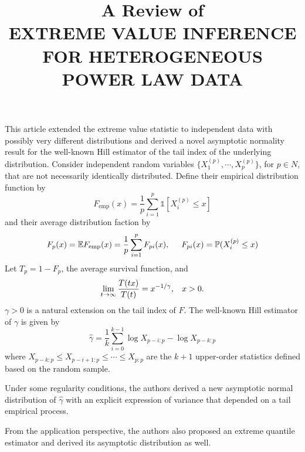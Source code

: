 \documentclass[11pt]{article}
\title{A Review of \\ EXTREME VALUE INFERENCE FOR HETEROGENEOUS POWER LAW DATA}
\begin{document}
	\maketitle	


This article extended the extreme value statistic to independent data with possibly very different distributions and derived a novel asymptotic normality result for the well-known Hill estimator of the tail index of the underlying distribution. Consider independent random variables $\{ X^{(p)}_1, \cdots, X^{(p)}_p \}$, for $p \in N$, that are not necessarily identically distributed. Define their empirical distribution function by
$$
F_{\text{emp}}(x) = \frac{1}{p}\sum_{i=1}^p \mathbb{1}[X_i^{(p)} \le x]
$$
and their average distribution faction by
$$
F_p(x) = \mathbb{E} F_{\text{emp}}(x) = \frac{1}{p}\sum_{i=1}^p F_{pi}(x), \hspace{5mm} F_{pi}(x) = \mathbb{P}(X_i^{(p)} \le x)
$$
Let $T_p = 1 - F_p$, the average survival function, and 
$$
\lim_{t \to \infty}\frac{T(tx)}{T(t)} = x^{-1/\gamma}, \hspace{3mm} x > 0.
$$
$\gamma > 0$ is a natural extension on the tail index of $F$. The well-known Hill estimator of $\gamma$ is given by
$$
\hat{\gamma} = \frac{1}{k}\sum_{i=0}^{k-1} \log X_{p-i:p} - \log X_{p-k:p}
$$
where $X_{p-k:p} \le X_{p-i+1:p} \le \cdots \le X_{p:p}$ are the $k+1$ upper-order statistics defined based on the random sample. 

Under some regularity conditions, the authors derived a new asymptotic normal distribution of $\hat{\gamma}$ with an explicit expression of variance that depended on a tail empirical process.

From the application perspective, the authors also proposed an extreme quantile estimator and derived its asymptotic distribution as well. 
\end{document}

